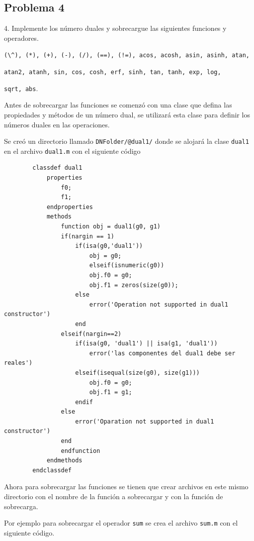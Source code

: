 \documentclass[a4paper, 12pt]{article}
\begin{document}
    \subsection{Problema 4}

    4. Implemente los número duales y sobrecargue las siguientes funciones y operadores.

    \verb|(\^), (*), (+), (-), (/), (==), (!=), acos, acosh, asin, asinh, atan,|
    
    \verb|atan2, atanh, sin, cos, cosh, erf, sinh, tan, tanh, exp, log,|
    
    \verb|sqrt, abs|.

    Antes de sobrecargar las funciones se comenzó con una clase que defina las propiedades y métodos de un número dual, se utilizará esta clase para definir los números duales en las operaciones.

    Se creó un directorio llamado \verb|DNFolder/@dual1/| donde se alojará la clase \verb|dual1| en el archivo \verb|dual1.m| con el siguiente código

    \begin{verbatim}
        classdef dual1
            properties
                f0;
                f1;
            endproperties
            methods
                function obj = dual1(g0, g1)
                if(nargin == 1)
                    if(isa(g0,'dual1'))
                        obj = g0;
                        elseif(isnumeric(g0))
                        obj.f0 = g0;
                        obj.f1 = zeros(size(g0));
                    else
                        error('Operation not supported in dual1 constructor')
                    end
                elseif(nargin==2)
                    if(isa(g0, 'dual1') || isa(g1, 'dual1'))
                        error('las componentes del dual1 debe ser reales')
                    elseif(isequal(size(g0), size(g1)))
                        obj.f0 = g0;
                        obj.f1 = g1;
                    endif
                else
                    error('Oparation not supported in dual1 constructor')
                end
                endfunction
            endmethods
        endclassdef
    \end{verbatim}

    Ahora para sobrecargar las funciones se tienen que crear archivos en este mismo directorio con el nombre de la función a sobrecargar y con la función de sobrecarga.

    Por ejemplo para sobrecargar el operador \verb|sum| se crea el archivo \verb|sum.m| con el siguiente código.
\end{document}
